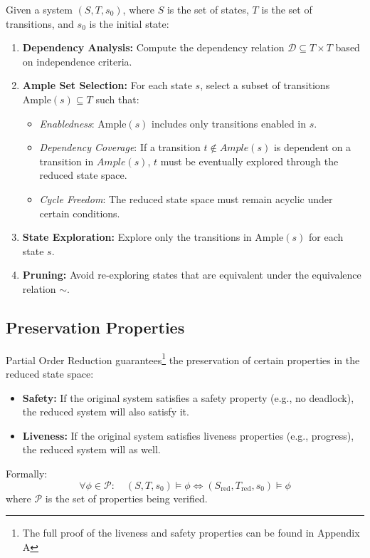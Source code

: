 Given a system \( (S, T, s_0) \), where \( S \) is the set of states, \( T \) is the set of transitions, and \( s_0 \) is the initial state:
\begin{enumerate}
    \item \textbf{Dependency Analysis:} Compute the dependency relation \( \mathcal{D} \subseteq T \times T \) based on independence criteria.
    \item \textbf{Ample Set Selection:} For each state \( s \), select a subset of transitions \( \text{Ample}(s) \subseteq T \) such that:
    \begin{itemize}
        \item \textit{Enabledness}: \( \text{Ample}(s) \) includes only transitions enabled in \( s \).
        \item \textit{Dependency Coverage}: If a transition $t \notin Ample(s)$ is dependent on a transition in $Ample(s)$, $t$ must be eventually explored through the reduced state space.
        \item \textit{Cycle Freedom}: The reduced state space must remain acyclic under certain conditions.
    \end{itemize}
    \item \textbf{State Exploration:} Explore only the transitions in \( \text{Ample}(s) \) for each state \( s \).
    \item \textbf{Pruning:} Avoid re-exploring states that are equivalent under the equivalence relation \( \sim \).
\end{enumerate}

\subsection{Preservation Properties}
Partial Order Reduction guarantees\footnote{The full proof of the liveness and safety properties can be found in Appendix A} the preservation of certain properties in the reduced state space:
\begin{itemize}
    \item \textbf{Safety:} If the original system satisfies a safety property (e.g., no deadlock), the reduced system will also satisfy it.
    \item \textbf{Liveness:} If the original system satisfies liveness properties (e.g., progress), the reduced system will as well.
\end{itemize}

Formally:
\[
\forall \phi \in \mathcal{P}: \quad (S, T, s_0) \models \phi \iff (S_{\text{red}}, T_{\text{red}}, s_0) \models \phi
\]
where \( \mathcal{P} \) is the set of properties being verified.

